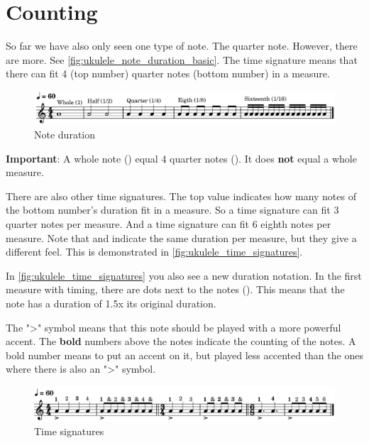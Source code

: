 \section{Counting}

So far we have also only seen one type of note. The quarter note. However, there are more. See \autoref{fig:ukulele_note_duration_basic}. The  time signature means that there can fit 4 (top number) quarter notes (bottom number) in a measure. 

\begin{figure}[h]
	\centering
	\includegraphics[width=\textwidth]{../../MuseScore/Ukulele/MusicNotation/NoteDurations_Basic.png}
	\caption{Note duration}
	\label{fig:ukulele_note_duration_basic}
\end{figure}

\textbf{Important}: A whole note (\wholeNote) equal 4 quarter notes (\quarterNote). It does \textbf{not} equal a whole measure. \newline

There are also other time signatures. The top value indicates how many notes of the bottom number's duration fit in a measure. So a  time signature can fit 3 quarter notes per measure. And a  time signature can fit 6 eighth notes per measure. Note that  and  indicate the same duration per measure, but they give a different feel. This is demonstrated in \autoref{fig:ukulele_time_signatures}.

In \autoref{fig:ukulele_time_signatures} you also see a new duration notation. In the first measure with  timing, there are dots next to the notes (\quarterNoteDottedDown). This means that the note has a duration of 1.5x its original duration.

The ">" symbol means that this note should be played with a more powerful accent. The \textbf{bold} numbers above the notes indicate the counting of the notes. A bold number means to put an accent on it, but played less accented than the ones where there is also an ">" symbol.

\begin{figure}[h]
	\centering
	\includegraphics[width=\textwidth]{../../MuseScore/Ukulele/MusicNotation/TimeSignature.png}
	\caption{Time signatures}
	\label{fig:ukulele_time_signatures}
\end{figure}

